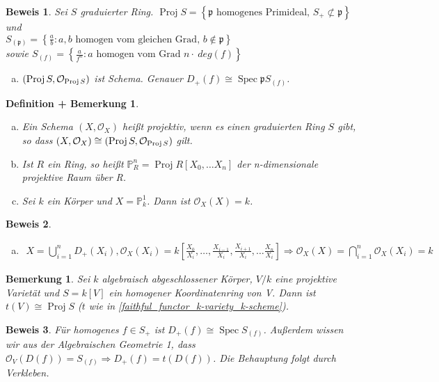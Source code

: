 \documentclass[a4paper,oneside]{scrbook}
\theoremstyle{break}
\newtheorem{DefBem}[Def]{Definition + Bemerkung}
\newtheorem{Bem}[Def]{Bemerkung}
\theoremstyle{nonumberbreak}
\theoremstyle{nonumberplain}
\newtheorem{Bew}{Beweis}
\theoremstyle{break}
\newcommand{\Spec}{%
	\ensuremath{\operatorname{Spec}}%
}
\newcommand{\Proj}{%
	\ensuremath{\operatorname{Proj}}%
}
\begin{document}
\begin{Bew}
 Sei $S$ graduierter Ring. $\Proj{S} = \left\lbrace \mathfrak{p} \text{ homogenes Primideal, } S_+ \not\subset \mathfrak{p} \right\rbrace$ und \\
$S_{(\mathfrak{p})}=\left\lbrace \frac{a}{b}: a,b \text{ homogen vom gleichen Grad, } b \notin \mathfrak{p} \right\rbrace $ \\
sowie $S_{(f)}=\left\lbrace \frac{a}{f^n}: a \text{ homogen vom Grad } n \cdot~ deg(f) \right\rbrace $
\begin{enumerate}[(g)]
 \item $(\Proj S, \mathcal{O}_{\Proj S})$ ist Schema. Genauer $D_+(f) \cong \Spec{\mathfrak{p} S_{(f)}}$.  
\end{enumerate}

\end{Bew}

\begin{DefBem}
	\begin{enumerate}[(a)]
		\item Ein Schema $(X,\mathcal{O}_X)$ heißt projektiv, wenn es einen graduierten Ring $S$ gibt, so dass $(X,\mathcal{O}_X) \cong (\Proj S, \mathcal{O}_{\Proj S})$  gilt.
		\item Ist $R$ ein Ring, so heißt $\mathbb{P}^n_R = \Proj {R[X_0,\dots X_n]}$ der n-dimensionale projektive Raum über R.
		\item Sei $k$ ein Körper und $X=\mathbb{P}^1_k$. Dann ist $\mathcal{O}_X(X)=k$.
	\end{enumerate}
\end{DefBem}
\begin{Bew}
	\begin{enumerate}[(c)]
		\item
			\begin{align*}
			 X = \bigcup_{i=1}^n D_+(X_i), \mathcal{O}_X(X_i)=k[\frac{X_0}{X_i},\dots,\frac{X_{i-1}}{X_i}, \frac{X_{i+1}}{X_i}, \dots \frac{X_n}{X_i} ] \Rightarrow \mathcal{O}_X(X) = \bigcap_{i=1}^n \mathcal{O}_X(X_i)=k
			\end{align*}
 
	\end{enumerate}
\end{Bew}

\begin{Bem}
	Sei $k$ algebraisch abgeschlossener Körper, $V/k$ eine projektive Varietät und $S=k[V]$ ein homogener Koordinatenring von V. Dann ist $t(V) \cong \Proj S$ ($t$ wie in \ref{faithful_functor_k-variety_k-scheme}).
\end{Bem}
\begin{Bew}
	Für homogenes $f \in S_+$ ist $D_+(f) \cong \Spec{S_{(f)}}$. Außerdem wissen wir aus der Algebraischen Geometrie 1, dass $\mathcal{O}_V(D(f))=S_{(f)} \Rightarrow D_+(f)=t(D(f))$.
	Die Behauptung folgt durch Verkleben.
\end{Bew}
\end{document}

